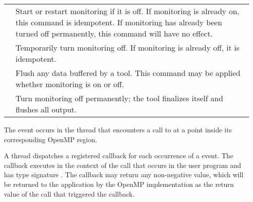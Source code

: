 \nolinenumbers
\renewcommand{\arraystretch}{1.5}
\tablelasttail{\hline}
\begin{supertabular}{p{2in} p{3.0in}}
{} & Start or restart monitoring if it is 
                                   off. If monitoring is already on, this
                                   command is idempotent. If monitoring has 
                                   already been turned off permanently, this 
                                   command will have no effect.\\
{} & Temporarily turn monitoring off. If 
                                   monitoring is already off, it is idempotent.\\
{} & Flush any data buffered by a tool.
                                   This command may be applied whether 
                                   monitoring is on or off.\\
{}   & Turn monitoring off permanently;
                                   the tool finalizes itself and flushes all output.\\
\end{supertabular}

\linenumbers

\events
The  event occurs in the thread that encounters a call
to  at a point inside its corresponding OpenMP region.

\tools
A thread dispatches a registered  callback 
for each occurrence of a  event. The callback executes in 
the context of the call that occurs in the user program and has type signature 
. The callback may return any non-negative 
value, which will be returned to the application by the OpenMP implementation 
as the return value of the  call that triggered the callback.

